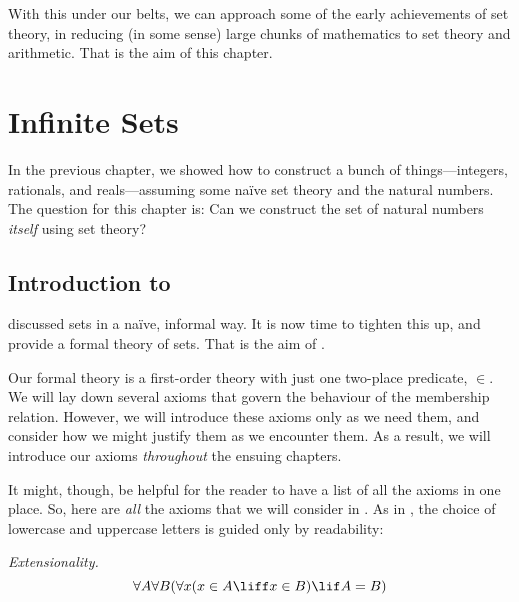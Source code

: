 With this under our belts, we can approach some of the early
achievements of set theory, in reducing (in some sense) large chunks
of mathematics to set theory and arithmetic. That is the aim of this
chapter.


\chapter{Infinite Sets}

In the previous chapter, we showed how to construct a bunch of
things---integers, rationals, and reals---assuming some na\"{i}ve set
theory and the natural numbers. The question for this chapter is: Can
we construct the set of natural numbers \emph{itself} using set
theory?

\olresetchapter

\OLEndPartHook


\section*{Introduction to }

 discussed sets in a na\"{i}ve, informal way. It
is now time to tighten this up, and provide a formal theory of sets.
That is the aim of . 

Our formal theory is a first-order theory with just one two-place
predicate, $\in$. We will lay down several axioms that govern the
behaviour of the membership relation. However, we will introduce these
axioms only as we need them, and consider how we might justify them as
we encounter them. As a result, we will introduce our axioms
\emph{throughout} the ensuing chapters.

It might, though, be helpful for the reader to have a list of all the
axioms in one place. So, here are \emph{all} the axioms that we will
consider in . As in , the
choice of lowercase and uppercase letters is guided only by
readability:

\begin{defish}
\emph{Extensionality.} 
\[\forall A \forall B(\forall x(x \in A \liff x \in B) \lif A = B)\]
\end{defish}

